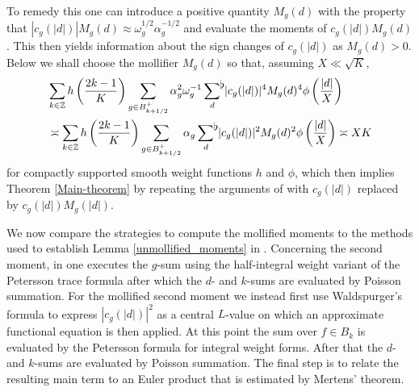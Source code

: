 \documentclass[a4paper,10pt,twoside]{amsart}
\theoremstyle{definition}
\numberwithin{equation}{section}
\newcommand\Z{\mathbb{Z}}
\renewcommand\:{\colon}
\newcommand{\sumflat}{\mathop{{\sum}^{\raisebox{-3pt}{\makebox[0pt][l]{$\flat$}}}}}
\begin{document}
To remedy this one can introduce a positive quantity $M_g(d)$ with the property that $|c_g(|d|)|M_g(d)\approx \omega_g^{1/2}\alpha_g^{-1/2}$ and evaluate the moments of $c_g(|d|)M_g(d)$. This then yields information about the sign changes of $c_g(|d|)$ as $M_g(d)>0$. Below we shall choose the mollifier $M_g(d)$ so that, assuming $X\ll\sqrt{K}$, 
\begin{align*}
&\sum_{k\in\Z}h\left(\frac{2k-1}K\right)\sum_{g\in B_{k+1/2}^+}\alpha_g^2\omega_g^{-1}\sumflat_d\,|c_g(|d|)|^4M_g(d)^4\phi\left(\frac{|d|}X\right)\\
&\asymp\sum_{k\in\Z}h\left(\frac{2k-1}K\right)\sum_{g\in B_{k+1/2}^+}\alpha_g\sumflat_d\,|c_g(|d|)|^2M_g(d)^2\phi\left(\frac{|d|}X\right)\asymp XK
\end{align*}
for compactly supported smooth weight functions $h$ and $\phi$, which then implies Theorem \ref{Main-theorem} by repeating the arguments of \cite{Jaasaari2026} with $c_g(|d|)$ replaced by $c_g(|d|)M_g(|d|)$. 

We now compare the strategies to compute the mollified moments to the methods used to establish Lemma \ref{unmollified_moments} in \cite{Jaasaari2026}. Concerning the second moment, in \cite{Jaasaari2026} one executes the $g$-sum using the half-integral weight variant of the Petersson trace formula after which the $d$- and $k$-sums are evaluated by Poisson summation. For the mollified second moment we instead first use Waldspurger's formula to express $|c_g(|d|)|^2$ as a central $L$-value on which an approximate functional equation is then applied. At this point the sum over $f\in B_k$ is evaluated by the Petersson formula for integral weight forms. After that the $d$- and $k$-sums are evaluated by Poisson summation. The final step is to relate the resulting main term to an Euler product that is estimated by Mertens' theorem. 
\end{document}
